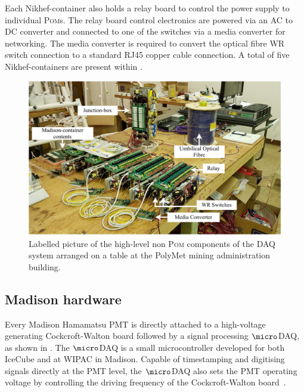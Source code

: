 Each Nikhef-container also holds a relay board to control the power supply to individual
\textsc{Pom}s. The relay board control electronics are powered via an AC to DC converter and
connected to one of the switches via a media converter for networking. The media converter is
required to convert the optical fibre WR switch connection to a standard RJ45 copper cable
connection. A total of five Nikhef-containers are present within \chipsfive.

\begin{figure} %
    \includegraphics[width=\textwidth]{diagrams/5-daq/full_setup.pdf}
    \caption[Labelled picture of the high-level components of the \chipsfive DAQ system]
    {Labelled picture of the high-level non \textsc{Pom} components of the \chipsfive DAQ system
        arranged on a table at the PolyMet mining administration building.}
    \label{fig:full_setup}
\end{figure}

\subsection{Madison hardware} %
\label{sec:daq_hard_madison} %

Every Madison Hamamatsu PMT is directly attached to a high-voltage generating Cockcroft-Walton
board followed by a signal processing $\micro$DAQ, as shown in
. The $\micro$DAQ is a small microcontroller developed for
both IceCube and \chips at WIPAC in Madison. Capable of timestamping and digitising signals
directly at the PMT level, the $\micro$DAQ also sets the PMT operating voltage by controlling the
driving frequency of the Cockcroft-Walton board~\cite{eijk2018}.

